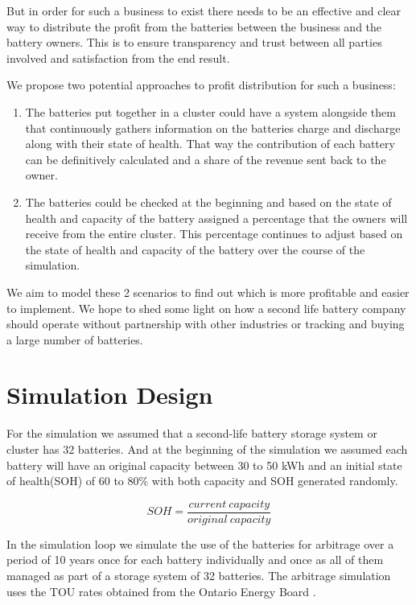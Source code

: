 \documentclass[conference]{IEEEtran}
\begin{document}
But in order for such a business to exist there needs to be an effective and clear way to distribute the profit from the batteries between the business and the battery owners. This is to ensure transparency and trust between all parties involved and satisfaction from the end result.

We propose two potential approaches to profit distribution for such a business:

\begin{enumerate}
    \item The batteries put together in a cluster could have a system alongside them that continuously gathers information on the batteries charge and discharge along with their state of health. That way the contribution of each battery can be definitively calculated and a share of the revenue sent back to the owner.
    \item The batteries could be checked at the beginning and based on the state of health and capacity of the battery assigned a percentage that the owners will receive from the entire cluster. This percentage continues to adjust based on the state of health and capacity of the battery over the course of the simulation.
\end{enumerate}

We aim to model these 2 scenarios to find out which is more profitable and easier to
implement. We hope to shed some light on how a second life battery company should operate
without partnership with other industries or tracking and buying a large number of batteries.

\section{Simulation Design}

For the simulation we assumed that a second-life battery storage system or cluster has 32 batteries. And at the beginning of the simulation we assumed each battery will have an original capacity between 30 to 50 kWh and an initial state of health(SOH) of 60 to 80\% with both capacity and SOH generated randomly.

\begin{equation}
	SOH = \frac{current \ capacity}{original \ capacity}
\end{equation}

In the simulation loop we simulate the use of the batteries for arbitrage over a period of 10 years once for each battery individually and once as all of them managed as part of a storage system of 32 batteries. The arbitrage simulation uses the TOU rates obtained from the Ontario Energy Board \cite{b11}.
\end{document}
